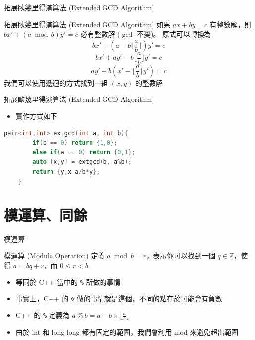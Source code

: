 \documentclass[aspectratio=169]{beamer}
\begin{document}
    \begin{frame}{拓展歐幾里得演算法 (Extended GCD Algorithm)}
        \begin{alertblock}{拓展歐幾里得演算法 (Extended GCD Algorithm)}
            如果 $ax+by=c$ 有整數解，則 $bx'+(a \bmod b)y' = c$ 必有整數解 ($\gcd$ 不變)。 
            \vspace{2.5mm}
            原式可以轉換為 
            $$bx' + (a - b \Big \lfloor \dfrac{a}{b} \Big \rfloor)y' = c$$
            $$bx' + ay' - b \Big \lfloor \dfrac{a}{b} \Big \rfloor y' = c$$
            $$ay' + b (x' - \Big \lfloor \dfrac{a}{b} \Big \rfloor y') = c$$
            我們可以使用遞迴的方式找到一組 $(x,y)$ 的整數解
        \end{alertblock} 
    \end{frame}
    
    \begin{frame}[fragile]{拓展歐幾里得演算法 (Extended GCD Algorithm)}
        \begin{itemize}
            \item 實作方式如下
        \end{itemize}
        \begin{lstlisting}[language=C++,basicstyle=\ttfamily \small]
    pair<int,int> extgcd(int a, int b){
        if(b == 0) return {1,0};
        else if(a == 0) return {0,1};
        auto [x,y] = extgcd(b, a%b);
        return {y,x-a/b*y};
    }
        \end{lstlisting}
    \end{frame}
    
    \section{模運算、同餘}
    \begin{frame}{模運算}
        \begin{block}{模運算 (Modulo Operation)}
            定義 $a \bmod b = r$，表示你可以找到一個 $q \in \mathbb{Z}$，使得 $a = bq+r$，而 $0 \le r < b$ 
            \begin{itemize}
                \item 等同於 C++ 當中的 \texttt{\%} 所做的事情
                \item 事實上，C++ 的 \texttt{\%} 做的事情就是這個，不同的點在於可能會有負數
                \item C++ 的 \texttt{\%} 定義為 $a \ \% \ b = a-b \times \Big \lfloor \frac{a}{b} \Big \rfloor$
                \item 由於 int 和 long long 都有固定的範圍，我們會利用 mod 來避免超出範圍
            \end{itemize}
        \end{block}
    \end{frame}
    
\end{document}
